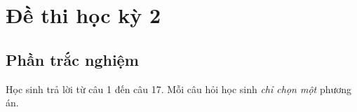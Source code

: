 \documentclass[12pt,a4paper,openany,twoside]{report}
\begin{document}
\hienthiloigiaiex
\hienthiloigiaibt
\section[Mã đề 789]{Đề thi học kỳ 2}
\subsection{Phần trắc nghiệm}
Học sinh trả lời từ câu 1 đến câu 17.
 Mỗi câu hỏi học sinh \textit{chỉ chọn một} phương án.
    
    
\fileend
\end{document}
